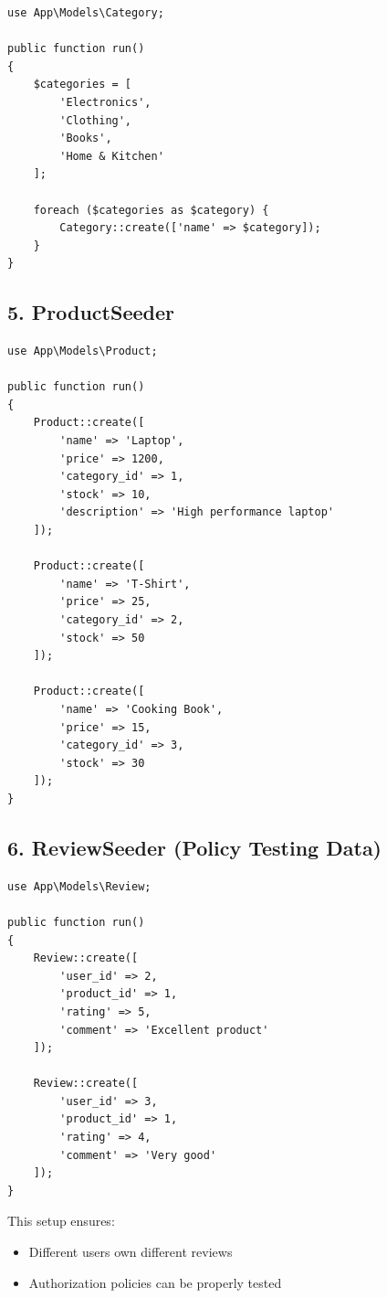\documentclass[12pt,a4paper]{article}
\begin{document}
\begin{verbatim}
use App\Models\Category;

public function run()
{
    $categories = [
        'Electronics',
        'Clothing',
        'Books',
        'Home & Kitchen'
    ];

    foreach ($categories as $category) {
        Category::create(['name' => $category]);
    }
}
\end{verbatim}

\subsection{5. ProductSeeder}

\begin{verbatim}
use App\Models\Product;

public function run()
{
    Product::create([
        'name' => 'Laptop',
        'price' => 1200,
        'category_id' => 1,
        'stock' => 10,
        'description' => 'High performance laptop'
    ]);

    Product::create([
        'name' => 'T-Shirt',
        'price' => 25,
        'category_id' => 2,
        'stock' => 50
    ]);

    Product::create([
        'name' => 'Cooking Book',
        'price' => 15,
        'category_id' => 3,
        'stock' => 30
    ]);
}
\end{verbatim}

\subsection{6. ReviewSeeder (Policy Testing Data)}

\begin{verbatim}
use App\Models\Review;

public function run()
{
    Review::create([
        'user_id' => 2,
        'product_id' => 1,
        'rating' => 5,
        'comment' => 'Excellent product'
    ]);

    Review::create([
        'user_id' => 3,
        'product_id' => 1,
        'rating' => 4,
        'comment' => 'Very good'
    ]);
}
\end{verbatim}

This setup ensures:
\begin{itemize}[noitemsep]
    \item Different users own different reviews
    \item Authorization policies can be properly tested
\end{itemize}
\end{document}

